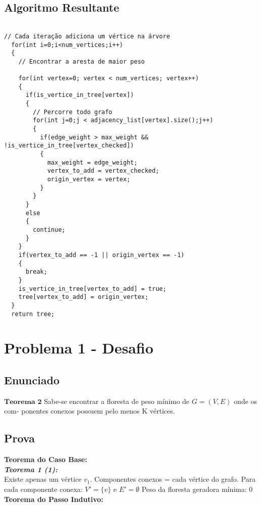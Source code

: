 \documentclass[12pt]{article}
\begin{document}
\subsection{ Algoritmo Resultante }
\begin{lstlisting}

// Cada iteração adiciona um vértice na árvore
  for(int i=0;i<num_vertices;i++)
  {
    // Encontrar a aresta de maior peso

    for(int vertex=0; vertex < num_vertices; vertex++)
    {
      if(is_vertice_in_tree[vertex])
      {
        // Percorre todo grafo
        for(int j=0;j < adjacency_list[vertex].size();j++)
        {
          if(edge_weight > max_weight && !is_vertice_in_tree[vertex_checked])
          {
            max_weight = edge_weight;
            vertex_to_add = vertex_checked;
            origin_vertex = vertex;
          }
        }
      }
      else
      {
        continue;
      }
    }
    if(vertex_to_add == -1 || origin_vertex == -1)
    {
      break;
    }
    is_vertice_in_tree[vertex_to_add] = true;
    tree[vertex_to_add] = origin_vertex;
  }
  return tree;
\end{lstlisting}


\section{Problema 1 - Desafio}

\subsection{ Enunciado }
\indent $\mathbf{Teorema}$ $\mathbf{2}$ Sabe-se encontrar a floresta de peso mínimo de $G = (V, E)$ onde os com-
ponentes conexos possuem pelo menos K vértices.


\subsection{ Prova }

\textbf{Teorema do Caso Base:}\\

\textit{\textbf{Teorema 1 (1):}}\\
Existe apenas um vértice $v_1$.
Componentes conexos = cada vértice do grafo.
Para cada componente conexa: $V'=\{v\}$ e $E' = \emptyset$
Peso da floresta geradora mínima: 0\\

\textbf{Teorema do Passo Indutivo:}\\
\end{document}
